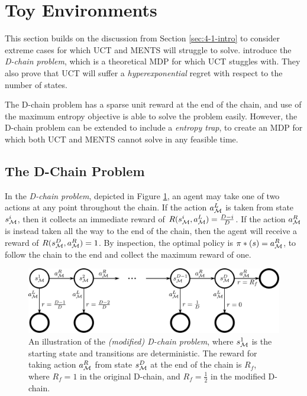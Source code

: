 \section{Toy Environments}
\label{sec:4-3-toyenvs}

    This section builds on the discussion from Section \ref{sec:4-1-intro} to consider extreme cases for which UCT and MENTS will struggle to solve. \citet{dchain} introduce the \textit{D-chain problem}, which is a theoretical MDP for which UCT stuggles with. They also prove that UCT will suffer a \textit{hyperexponential} regret with respect to the number of states. 

    The D-chain problem has a sparse unit reward at the end of the chain, and use of the maximum entropy objective is able to solve the problem easily. However, the D-chain problem can be extended to include a \textit{entropy trap}, to create an MDP for which both UCT and MENTS cannot solve in any feasible time.

    
    \subsection{The D-Chain Problem}

        \newcommand{\aL}{a^L_{\cl{M}}}
        \newcommand{\aR}{a^R_{\cl{M}}}
        \newcommand{\schain}[1]{s^{#1}_{\cl{M}}}

        In the \textit{D-chain problem}, depicted in Figure \ref{fig:modified_d_chain}, an agent may take one of two actions at any point throughout the chain. If the action $\aL$ is taken from state $\schain{i}$, then it collects an immediate reward of $R(\schain{i},\aL)=\frac{D-i}{D}$. If the action $\aR$ is instead taken all the way to the end of the chain, then the agent will receive a reward of $R(\schain{D},\aR)=1$. By inspection, the optimal policy is $\pi*(s)=\aR$, to follow the chain to the end and collect the maximum reward of one.

        \begin{figure}
            \centering
            \includegraphics[width=\textwidth]{figures/ch4/mod_dchain_mdp.pdf}
            \caption[An illustration of the \textit{(modified) D-chain problem}.]{An illustration of the \textit{(modified) D-chain problem}, where $\schain{1}$ is the starting state and transitions are deterministic. The reward for taking action $\aR$ from state $\schain{D}$ at the end of the chain is $R_f$, where $R_f=1$ in the original D-chain, and $R_f=\frac{1}{2}$ in the modified D-chain.}
            \label{fig:modified_d_chain}
        \end{figure}

